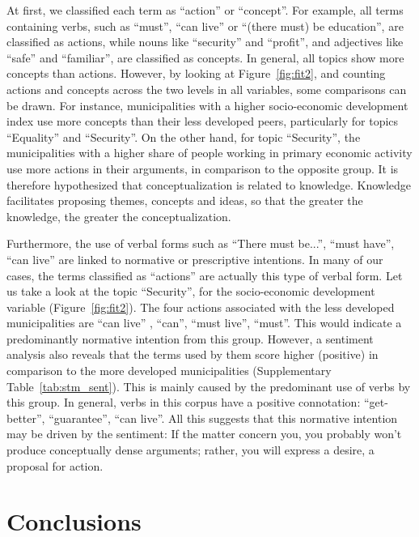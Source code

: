 \documentclass[onecolumn]{article}
\begin{document}
At first, we classified each term as ``action'' or ``concept''. For example, all terms containing verbs, such as ``must'', ``can live'' or ``(there must) be education'',  are classified as actions, while nouns like ``security'' and ``profit'', and adjectives like ``safe'' and ``familiar'', are classified as concepts. In general, all topics show more concepts than actions. However, by looking at  Figure~\ref{fig:fit2}, and counting actions and concepts across the two levels in all variables, some comparisons can be drawn. For instance, municipalities with a higher socio-economic development index use more concepts than their less developed peers, particularly for topics ``Equality'' and ``Security''. On the other hand, for topic ``Security'', the municipalities with a higher share of people working in primary economic activity use more actions in their arguments, in comparison to the opposite group. It is therefore hypothesized that conceptualization is related to knowledge. Knowledge facilitates proposing themes, concepts and ideas, so that the greater the knowledge, the greater the conceptualization. 

Furthermore, the use of verbal forms such as ``There must be...'', ``must have'', ``can live'' are linked to normative or prescriptive intentions. In many of our cases, the terms classified as ``actions'' are actually this type of verbal form. Let us take a look at the topic ``Security'', for the socio-economic development variable (Figure~\ref{fig:fit2}). The four actions associated with the less developed municipalities are ``can live'' , ``can'', ``must live'', ``must''.  This would indicate a predominantly normative intention from this group.  However,  a sentiment analysis also reveals that the terms used by them score higher (positive) in comparison to the more developed municipalities (Supplementary Table~\ref{tab:stm_sent}). This is mainly caused  by the predominant use of verbs by this group. In general, verbs in this corpus have a positive connotation: ``get-better'', ``guarantee'', ``can live''. All this suggests that this normative intention may be driven by the sentiment: If the matter concern you, you probably won't produce conceptually dense arguments; rather, you will express a desire, a proposal for action.

\section*{Conclusions}
\end{document}
